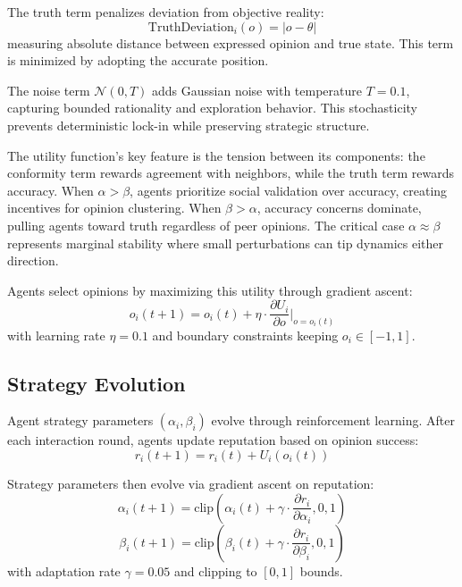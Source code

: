 \documentclass[11pt,a4paper]{article}
\begin{document}
The truth term penalizes deviation from objective reality:
\begin{equation}
\text{TruthDeviation}_i(o) = |o - \theta|
\end{equation}
measuring absolute distance between expressed opinion and true state. This term is minimized by adopting the accurate position.

The noise term $\mathcal{N}(0, T)$ adds Gaussian noise with temperature $T=0.1$, capturing bounded rationality and exploration behavior. This stochasticity prevents deterministic lock-in while preserving strategic structure.

The utility function's key feature is the tension between its components: the conformity term rewards agreement with neighbors, while the truth term rewards accuracy. When $\alpha > \beta$, agents prioritize social validation over accuracy, creating incentives for opinion clustering. When $\beta > \alpha$, accuracy concerns dominate, pulling agents toward truth regardless of peer opinions. The critical case $\alpha \approx \beta$ represents marginal stability where small perturbations can tip dynamics either direction.

Agents select opinions by maximizing this utility through gradient ascent:
\begin{equation}
o_i(t+1) = o_i(t) + \eta \cdot \frac{\partial U_i}{\partial o}\bigg|_{o=o_i(t)}
\end{equation}
with learning rate $\eta = 0.1$ and boundary constraints keeping $o_i \in [-1, 1]$.

\subsection{Strategy Evolution}

Agent strategy parameters $(\alpha_i, \beta_i)$ evolve through reinforcement learning. After each interaction round, agents update reputation based on opinion success:
\begin{equation}
r_i(t+1) = r_i(t) + U_i(o_i(t))
\end{equation}

Strategy parameters then evolve via gradient ascent on reputation:
\begin{equation}
\alpha_i(t+1) = \text{clip}\left(\alpha_i(t) + \gamma \cdot \frac{\partial r_i}{\partial \alpha_i}, 0, 1\right)
\end{equation}
\begin{equation}
\beta_i(t+1) = \text{clip}\left(\beta_i(t) + \gamma \cdot \frac{\partial r_i}{\partial \beta_i}, 0, 1\right)
\end{equation}
with adaptation rate $\gamma = 0.05$ and clipping to $[0, 1]$ bounds.
\end{document}
